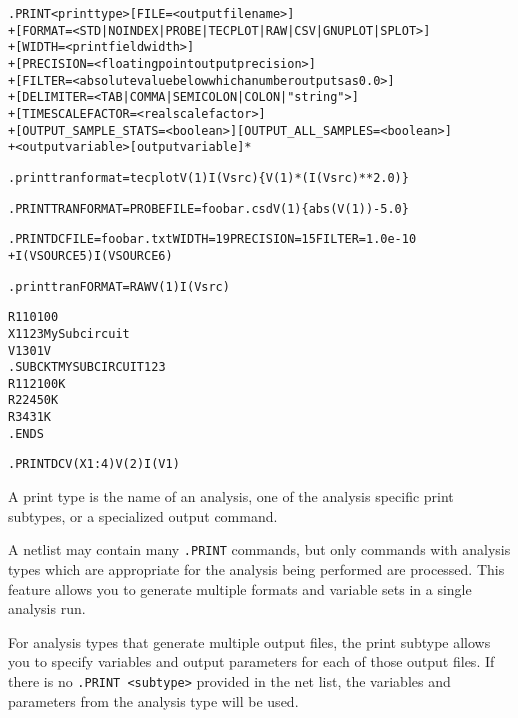 \begin{Command}

\format
\begin{alltt}
.PRINT <print type> [FILE=<output filename>]
+ [FORMAT=<STD|NOINDEX|PROBE|TECPLOT|RAW|CSV|GNUPLOT|SPLOT>]
+ [WIDTH=<print field width>]
+ [PRECISION=<floating point output precision>]
+ [FILTER=<absolute value below which a number outputs as 0.0>]
+ [DELIMITER=<TAB|COMMA|SEMICOLON|COLON|"string">] 
+ [TIMESCALEFACTOR=<real scale factor>]
+ [OUTPUT\_SAMPLE\_STATS=<boolean>] [OUTPUT\_ALL\_SAMPLES=<boolean>]
+ <output variable> [output variable]*
\end{alltt}

\examples
\begin{alltt}
.print tran format=tecplot V(1) I(Vsrc) \{V(1)*(I(Vsrc)**2.0)\}

.PRINT TRAN FORMAT=PROBE FILE=foobar.csd V(1) \{abs(V(1))-5.0\}

.PRINT DC FILE=foobar.txt WIDTH=19 PRECISION=15 FILTER=1.0e-10
+ I(VSOURCE5) I(VSOURCE6)

.print tran FORMAT=RAW V(1) I(Vsrc)

R1 1 0 100
X1 1 2 3 MySubcircuit
V1 3 0 1V
.SUBCKT MYSUBCIRCUIT 1 2 3
R1 1 2  100K
R2 2 4  50K
R3 4 3  1K
.ENDS

.PRINT DC V(X1:4) V(2) I(V1)
\end{alltt}


\arguments

\begin{Arguments}


A print type is the name of an analysis, one of the analysis specific
print subtypes, or a specialized output command.



A netlist may contain many \texttt{.PRINT} commands, but only commands
with analysis types which are appropriate for the analysis being
performed are processed.  This feature allows you to generate multiple
formats and variable sets in a single analysis run.

For analysis types that generate multiple output files, the print
subtype allows you to specify variables and output parameters for each
of those output files.  If there is no \texttt{.PRINT <subtype>} provided in the
net list, the variables and parameters from the analysis type will be
used.



\end{Arguments}
\end{Command}
